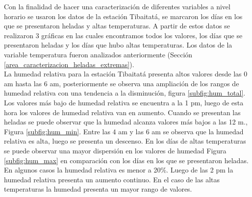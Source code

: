 %	

Con la finalidad de hacer una caracterización de diferentes variables a nivel horario se usaron los datos de la estación Tibaitatá, se marcaron los días en los que se presentaron heladas y altas temperaturas. A partir de estos datos se realizaron 3 gráficas en las cuales encontramos todos los valores, los días que se presentaron heladas y los días que hubo altas temperaturas. Los datos de la variable temperatura fueron analizados anteriormente (Sección \ref{area_caracterizacion_heladas_extremas}).\\

La humedad relativa para la estación Tibaitatá presenta altos valores desde las 0 am hasta las 6 am, posteriormente se observa una ampliación de los rangos de humedad relativa con una tendencia a la disminución, figura \ref{subfig:hum_total}. Los valores más bajo de humedad relativa se encuentra a la 1 pm, luego de esta hora los valores de humedad relativa van en aumento. Cuando se presentan las heladas se puede observar que la humedad alcanza valores más bajos a las 12 m., Figura \ref{subfig:hum_min}. Entre las 4 am y las 6 am se observa que la humedad relativa es alta, luego se presenta un descenso. En los días de altas temperaturas se puede observar una mayor dispersión en los valores de humedad Figura \ref{subfig:hum_max} en comparación con los días en los que se presentaron heladas. En algunos casos la humedad relativa es menor a 20\%. Luego de las 2 pm la humedad relativa presenta un aumento continuo. En el caso de las altas temperaturas la humedad presenta un mayor rango de valores.\\


